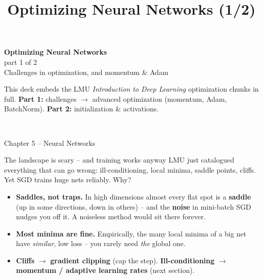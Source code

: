 \documentclass[aspectratio=43]{beamer}
\title{Optimizing Neural Networks (1/2)}
\date{}
\begin{document}
\begin{frame}[plain]
  \vfill
  \begin{center}
    {\Large\color{popblue}\textbf{Optimizing Neural Networks}}\\[0.3em]
    {\normalsize\color{gray} part 1 of 2}\\[0.4em]
    {\large Challenges in optimization, and momentum \& Adam}\\[1.0em]
    \begin{minipage}{0.86\textwidth}\centering\small
      This deck embeds the LMU \emph{Introduction to Deep Learning} optimization chunks in full.
      \textbf{Part 1:} challenges $\rightarrow$ advanced optimization (momentum, Adam,
      BatchNorm). \textbf{Part 2:} initialization \& activations.
    \end{minipage}\\[0.9em]
  \end{center}
  \vfill
  {\footnotesize\color{gray} Chapter 5 -- Neural Networks}
\end{frame}



\begin{frame}{The landscape is scary -- and training works anyway}
  LMU just catalogued everything that can go wrong: ill-conditioning, local minima, saddle
  points, cliffs. Yet SGD trains huge nets reliably. Why?
  \vfill
  \begin{itemize}\small
    \item \textbf{Saddles, not traps.} In high dimensions almost every flat spot is a
      \textbf{saddle} (up in some directions, down in others) -- and the \textbf{noise} in
      mini-batch SGD nudges you off it. A noiseless method would sit there forever.
    \item \textbf{Most minima are fine.} Empirically, the many local minima of a big net have
      \emph{similar}, low loss -- you rarely need \emph{the} global one.
    \item \textbf{Cliffs} $\to$ \textbf{gradient clipping} (cap the step). \textbf{Ill-conditioning}
      $\to$ \textbf{momentum / adaptive learning rates} (next section).
  \end{itemize}
  \vfill
\end{frame}
\end{document}

